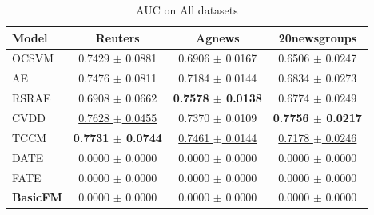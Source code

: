 \begin{table}[H]
\centering
\caption{AUC on All datasets}
\begin{tabular}{lccc}
\toprule
Model & Reuters & Agnews & 20newsgroups \\
\midrule
OCSVM & 0.7429 $\pm$ 0.0881 & 0.6906 $\pm$ 0.0167 & 0.6506 $\pm$ 0.0247 \\
AE & 0.7476 $\pm$ 0.0811 & 0.7184 $\pm$ 0.0144 & 0.6834 $\pm$ 0.0273 \\
RSRAE & 0.6908 $\pm$ 0.0662 & \textbf{0.7578 $\pm$ 0.0138} & 0.6774 $\pm$ 0.0249 \\
CVDD & \underline{0.7628 $\pm$ 0.0455} & 0.7370 $\pm$ 0.0109 & \textbf{0.7756 $\pm$ 0.0217} \\
TCCM & \textbf{0.7731 $\pm$ 0.0744} & \underline{0.7461 $\pm$ 0.0144} & \underline{0.7178 $\pm$ 0.0246} \\
DATE & 0.0000 $\pm$ 0.0000 & 0.0000 $\pm$ 0.0000 & 0.0000 $\pm$ 0.0000 \\
FATE & 0.0000 $\pm$ 0.0000 & 0.0000 $\pm$ 0.0000 & 0.0000 $\pm$ 0.0000 \\
\textbf{BasicFM} & 0.0000 $\pm$ 0.0000 & 0.0000 $\pm$ 0.0000 & 0.0000 $\pm$ 0.0000 \\
\bottomrule
\end{tabular}
\label{tab:ad_results}
\end{table}


